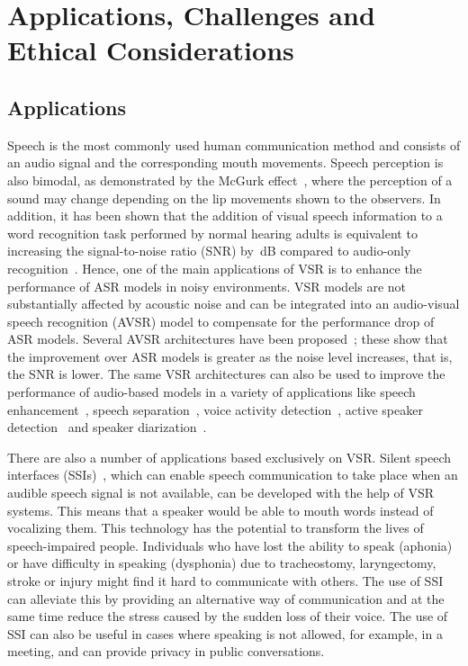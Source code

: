 \documentclass[twocolumn]{article}
\begin{document}
\section{Applications, Challenges and Ethical Considerations}
\subsection{Applications}
Speech is the most commonly used human communication method and consists of an audio signal and the corresponding mouth movements. Speech perception is also bimodal, as demonstrated by the McGurk effect~\cite{mcgurk1976hearing}, where the perception of a sound may change depending on the lip movements shown to the observers. In addition, it has been shown that the addition of visual speech information to a word recognition task performed by normal hearing adults is equivalent to increasing the signal-to-noise ratio (SNR) by \,dB compared to audio-only recognition~\cite{sumby1954visual}. Hence, one of the main applications of VSR is to enhance the performance of ASR models in noisy environments. VSR models are not substantially affected by acoustic noise and can be integrated into an audio-visual speech recognition (AVSR) model to compensate for the performance drop of ASR models. Several AVSR architectures have been proposed~\cite{afouras2018deep, DBLP:journals/corr/abs-2102-06657, makino2019recurrent, petridis2018audio, yu2020audio, DBLP:conf/icassp/YuZK21,DBLP:journals/taslp/SterpuSH20}; these show that the improvement over ASR models is greater as the noise level increases, that is, the SNR is lower. The same VSR architectures can also be used to improve the performance of audio-based models in a variety of applications like speech enhancement~\cite{DBLP:conf/interspeech/AfourasCZ18}, speech separation~\cite{DBLP:journals/tog/EphratMLDWHFR18}, voice activity detection~\cite{DBLP:conf/icassp/YoshimuraHT020}, active speaker detection~\cite{DBLP:journals/corr/abs-2108-07640} and speaker diarization~\cite{DBLP:conf/interspeech/ChungHNAZ20}.

There are also a number of applications based exclusively on VSR. Silent speech interfaces (SSIs)~\cite{denby2010silent}, which can enable speech communication to take place when an audible speech signal is not available, can be developed with the help of VSR systems. This means that a speaker would be able to mouth words instead of vocalizing them. This technology has the potential to transform the lives of speech-impaired people. Individuals who have lost the ability to speak (aphonia) or have difficulty in speaking (dysphonia) due to tracheostomy, laryngectomy, stroke or injury might find it hard to communicate with others. The use of SSI can alleviate this by providing an alternative way of communication and at the same time reduce the stress caused by the sudden loss of their voice. The use of SSI can also be useful in cases where speaking is not allowed, for example, in a meeting, and can provide privacy in public conversations.
\end{document}
